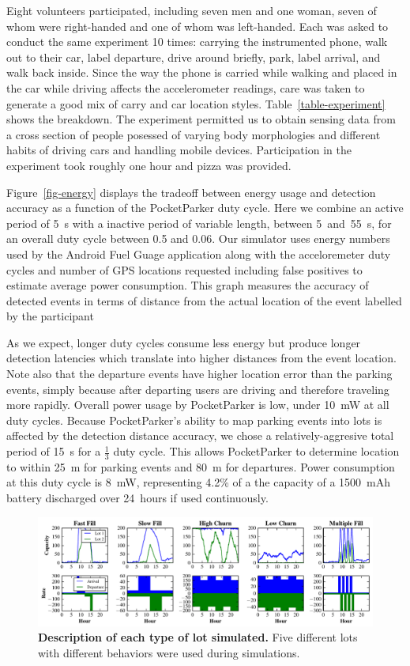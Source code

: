 Eight volunteers participated, including seven men and one woman, seven of
whom were right-handed and one of whom was left-handed. Each was asked to
conduct the same experiment 10 times: carrying the instrumented phone, walk
out to their car, label departure, drive around briefly, park, label arrival,
and walk back inside. Since the way the phone is carried while walking and
placed in the car while driving affects the accelerometer readings, care was
taken to generate a good mix of carry and car location styles.
Table~\ref{table-experiment} shows the breakdown. The experiment permitted us
to obtain sensing data from a cross section of people posessed of varying
body morphologies and different habits of driving cars and handling mobile
devices. Participation in the experiment took roughly one hour and pizza was
provided.

Figure~\ref{fig-energy} displays the tradeoff between energy usage and
detection accuracy as a function of the PocketParker duty cycle. Here we
combine an active period of 5~s with a inactive period of variable length,
between 5~and~55~s, for an overall duty cycle between 0.5 and 0.06. Our
simulator uses energy numbers used by the Android Fuel Guage application
along with the acceloremeter duty cycles and number of GPS locations
requested including false positives to estimate average power consumption.
This graph measures the accuracy of detected events in terms of distance from
the actual location of the event labelled by the participant

As we expect, longer duty cycles consume less energy but produce longer
detection latencies which translate into higher distances from the event
location. Note also that the departure events have higher location error than
the parking events, simply because after departing users are driving and
therefore traveling more rapidly. Overall power usage by PocketParker is low,
under 10~mW at all duty cycles. Because PocketParker's ability to map parking
events into lots is affected by the detection distance accuracy, we chose a
relatively-aggresive total period of 15~s for a $\frac{1}{3}$ duty cycle.
This allows PocketParker to determine location to within 25~m for parking
events and 80~m for departures. Power consumption at this duty cycle is 8~mW,
representing 4.2\% of a the capacity of a 1500~mAh battery discharged over
24~hours if used continuously.

\begin{figure}
\centering
\includegraphics[width=\textwidth]{./simulator/figures/lots.pdf}

\caption{\textbf{Description of each type of lot simulated.} Five different
lots with different behaviors were used during simulations.}

\label{fig-lotsdescription}
\end{figure}

